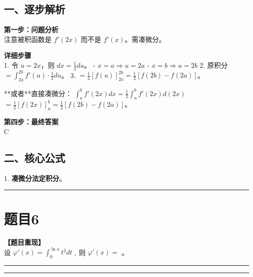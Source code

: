 \documentclass[12pt, a4paper]{ctexart}
\newcommand{\TopSeparator}{
    \par\noindent\rule{\textwidth}{1.5pt}\vspace{0.5em} %
}
\newcommand{\AnalysisSeparator}{
    \par\noindent\rule{\textwidth}{0.5pt}\vspace{0.2em}\hrule\vspace{0.5em} %
}
\newenvironment{RedAnalysis}{
    \par
    \color{red} %
}{
    \par
    \color{black} %
}
\begin{document}
\begin{RedAnalysis}

\subsection*{一、逐步解析}

\textbf{第一步：问题分析} \\
注意被积函数是 $f'(2x)$ 而不是 $f'(x)$。需凑微分。

\textbf{详细步骤} \\
1. 令 $u = 2x$，则 $dx = \frac{1}{2} du$。
   - $x=a \Rightarrow u=2a$
   - $x=b \Rightarrow u=2b$
2. 原积分 $= \int_{2a}^{2b} f'(u) \cdot \frac{1}{2} du$。
3. $= \frac{1}{2} [f(u)]_{2a}^{2b} = \frac{1}{2}[f(2b) - f(2a)]$。
   
   **或者**直接凑微分：
   $\int_{a}^{b} f'(2x) dx = \frac{1}{2} \int_{a}^{b} f'(2x) d(2x)$
   $= \frac{1}{2} [f(2x)]_a^b = \frac{1}{2}[f(2b) - f(2a)]$。

\textbf{第四步：最终答案} \\
C

\subsection*{二、核心公式}
1. \textbf{凑微分法定积分}。

\end{RedAnalysis}

\vspace{2em}

\TopSeparator
\section*{题目6}

\textbf{【题目重现】} \\
设 $ \varphi'(x) = \int_{0}^{\ln x} t^{2} dt $ , 则 $ \varphi'(x) = $ \underline{\hspace{2cm}}。

\AnalysisSeparator
\end{document}
